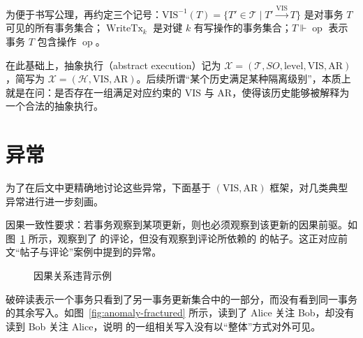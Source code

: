 为便于书写公理，再约定三个记号：$\operatorname{VIS^{-1}}(T) = \{T' \in \mathcal{T} \mid T' \xrightarrow{\text{VIS}} T\}$ 是对事务 $T$ 可见的所有事务集合；$\operatorname{WriteTx}_k$ 是对键 $k$ 有写操作的事务集合；$T \Vdash \operatorname{op}$ 表示事务 $T$ 包含操作 $\operatorname{op}$。

在此基础上，抽象执行（abstract execution）记为 $\mathcal{X} = (\mathcal{T}, SO, \text{level}, \text{VIS}, \text{AR})$，简写为 $\mathcal{X} = (\mathcal{H}, \text{VIS}, \text{AR})$。后续所谓``某个历史满足某种隔离级别''，本质上就是在问：是否存在一组满足对应约束的 $\text{VIS}$ 与 $\text{AR}$，使得该历史能够被解释为一个合法的抽象执行。

\section{异常}
为了在后文中更精确地讨论这些异常，下面基于 $(\text{VIS}, \text{AR})$ 框架，对几类典型异常进行进一步刻画。

因果一致性要求：若事务观察到某项更新，则也必须观察到该更新的因果前驱。如图~\ref{fig:anomaly-causality} 所示，\Txc[3] 观察到了 \Txc[2] 的评论，但没有观察到评论所依赖的 \Txc[1] 的帖子。这正对应前文“帖子与评论”案例中提到的异常。

\begin{figure}[htbp]
    \centering
    \caption{因果关系违背示例}
    \label{fig:anomaly-causality}
\end{figure}

破碎读表示一个事务只看到了另一事务更新集合中的一部分，而没有看到同一事务的其余写入。如图~\ref{fig:anomaly-fractured} 所示，\Txc[2] 读到了 Alice 关注 Bob，却没有读到 Bob 关注 Alice，说明 \Txc[1] 的一组相关写入没有以“整体”方式对外可见。


